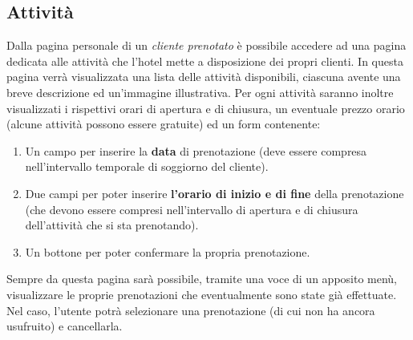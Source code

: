 \documentclass [a4paper, 12pt]{book}
\begin{document}
\medskip

\subsection{Attività}
\label{Attività}
Dalla pagina personale di un \textit{cliente prenotato} è possibile accedere ad una pagina dedicata alle attività che l'hotel mette a disposizione dei propri clienti. In questa pagina verrà visualizzata una lista delle attività disponibili, ciascuna avente una breve descrizione ed un'immagine illustrativa. Per ogni attività saranno inoltre visualizzati i rispettivi orari di apertura e di chiusura, un eventuale prezzo orario (alcune attività possono essere gratuite) ed un form contenente:
\begin{enumerate}
\item Un campo per inserire la \textbf{data} di prenotazione (deve essere compresa nell'intervallo temporale di soggiorno del cliente).
\item Due campi per poter inserire \textbf{l'orario di inizio e di fine} della prenotazione (che devono essere compresi nell'intervallo di apertura e di chiusura dell'attività che si sta prenotando).
\item Un bottone per poter confermare la propria prenotazione.
\end{enumerate}
Sempre da questa pagina sarà possibile, tramite una voce di un apposito menù,  visualizzare le proprie prenotazioni che eventualmente sono state già effettuate. Nel caso, l'utente potrà selezionare una prenotazione (di cui non ha ancora usufruito) e cancellarla.

\medskip
\end{document}
